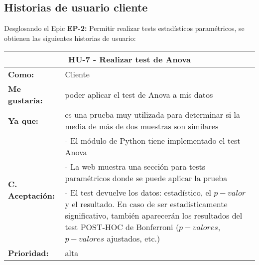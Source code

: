 \subsection{Historias de usuario cliente}


Desglosando el Epic \textbf{EP-2:} Permitir realizar tests estadísticos paramétricos, se obtienen las siguientes historias de usuario:

\begin{table}[H]
	\begin{tabular}{| p{3cm}| p{12cm} |}
		\hline
		\multicolumn{2}{|c|}{\textbf{HU-7} - Realizar test de Anova} \\ \hline
		\textbf{Como:} & Cliente \\ \hline
		\textbf{Me gustaría:} & poder aplicar el test de Anova a mis datos \\ \hline
		\textbf{Ya que:} & es una prueba muy utilizada para determinar si la media de más de dos muestras son similares \\ \hline
		\multirow{3}{12cm}{\textbf{C. Aceptación:}} & - El módulo de Python tiene implementado el test Anova \\
		& - La web muestra una sección para tests paramétricos donde se puede aplicar la prueba \\
		& - El test devuelve los datos: estadístico, el $p-valor$ y el resultado. En caso de ser estadísticamente significativo, también aparecerán los resultados del test POST-HOC de Bonferroni ($p-valores$, $p-valores$ ajustados, etc.) \\ \hline
		\textbf{\textbf{Prioridad:}} & alta \\ \hline
	\end{tabular}
\end{table}


